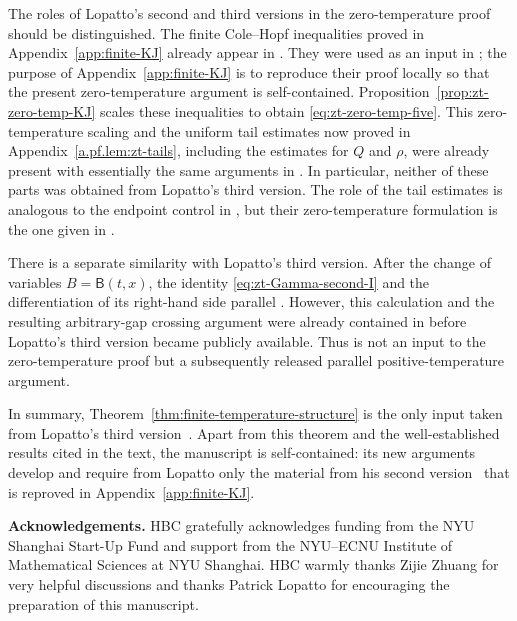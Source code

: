 \documentclass[10pt]{amsart}
\theoremstyle{definition}
\theoremstyle{remark}
\numberwithin{equation}{section}
\newcommand{\1}{\mathbf 1}
\begin{document}
The roles of Lopatto's second and third versions in the zero-temperature proof should be distinguished. The finite Cole--Hopf inequalities proved in Appendix~\ref{app:finite-KJ} already appear in \cite[Proposition 3.6 and Equation (3.39)]{Lopatto2026v2}. They were used as an input in \cite{AIxivPreprint}; the purpose of Appendix~\ref{app:finite-KJ} is to reproduce their proof locally so that the present zero-temperature argument is self-contained. Proposition~\ref{prop:zt-zero-temp-KJ} scales these inequalities to obtain \eqref{eq:zt-zero-temp-five}. This zero-temperature scaling and the uniform tail estimates now proved in Appendix~\ref{a.pf.lem:zt-tails}, including the estimates for $Q$ and $\rho$, were already present with essentially the same arguments in \cite{AIxivPreprint}. In particular, neither of these parts was obtained from Lopatto's third version. The role of the tail estimates is analogous to the endpoint control in \cite[Lemma 3.8 and the proof of Proposition 4.1]{Lopatto2026v2}, but their zero-temperature formulation is the one given in \cite{AIxivPreprint}.

There is a separate similarity with Lopatto's third version. After the change of variables $B=\mathsf B(t,x)$, the identity \eqref{eq:zt-Gamma-second-I} and the differentiation of its right-hand side parallel \cite[Proposition 9.1]{Lopatto2026}. However, this calculation and the resulting arbitrary-gap crossing argument were already contained in \cite{AIxivPreprint} before Lopatto's third version became publicly available. Thus \cite[Proposition 9.1]{Lopatto2026} is not an input to the zero-temperature proof but a subsequently released parallel positive-temperature argument.

In summary, Theorem~\ref{thm:finite-temperature-structure} is the only input taken from Lopatto's third version~\cite{Lopatto2026}. Apart from this theorem and the well-established results cited in the text, the manuscript is self-contained: its new arguments develop \cite{AIxivPreprint} and require from Lopatto only the material from his second version~\cite{Lopatto2026v2} that is reproved in Appendix~\ref{app:finite-KJ}.

\bigskip

\noindent\textbf{Acknowledgements.} HBC gratefully acknowledges funding from the NYU Shanghai Start-Up Fund and support from the NYU--ECNU Institute of Mathematical Sciences at NYU Shanghai. HBC warmly thanks Zijie Zhuang for very helpful discussions and thanks Patrick Lopatto for encouraging the preparation of this manuscript.
\end{document}
